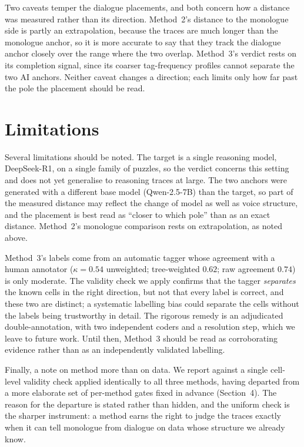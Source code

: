 \documentclass[10pt,twocolumn]{article}
\begin{document}
Two caveats temper the dialogue placements, and both concern how a distance was measured rather than
its direction. Method~2's distance to the monologue side is partly an extrapolation, because the
traces are much longer than the monologue anchor, so it is more accurate to say that they track the
dialogue anchor closely over the range where the two overlap. Method~3's verdict rests on its
completion signal, since its coarser tag-frequency profiles cannot separate the two AI anchors.
Neither caveat changes a direction; each limits only how far past the pole the placement should be
read.

\section{Limitations}
Several limitations should be noted. The target is a single reasoning model, DeepSeek-R1, on a single
family of puzzles, so the verdict concerns this setting and does not yet generalise to reasoning
traces at large. The two anchors were generated with a different base model (Qwen-2.5-7B) than the
target, so part of the measured distance may reflect the change of model as well as voice structure,
and the placement is best read as ``closer to which pole'' than as an exact distance. Method~2's
monologue comparison rests on extrapolation, as noted above.

Method~3's labels come from an automatic tagger whose agreement with a human annotator ($\kappa=0.54$
unweighted; tree-weighted $0.62$; raw agreement $0.74$) is only moderate. The validity check we apply
confirms that the tagger \emph{separates} the known cells in the right direction, but not that every
label is correct, and these two are distinct; a systematic labelling bias could separate the cells
without the labels being trustworthy in detail. The rigorous remedy is an adjudicated
double-annotation, with two independent coders and a resolution step, which we leave to future work.
Until then, Method~3 should be read as corroborating evidence rather than as an independently
validated labelling.

Finally, a note on method more than on data. We report against a single cell-level validity check
applied identically to all three methods, having departed from a more elaborate set of per-method
gates fixed in advance (Section~4). The reason for the departure is stated rather than hidden, and the
uniform check is the sharper instrument: a method earns the right to judge the traces exactly when it
can tell monologue from dialogue on data whose structure we already know.
\end{document}
